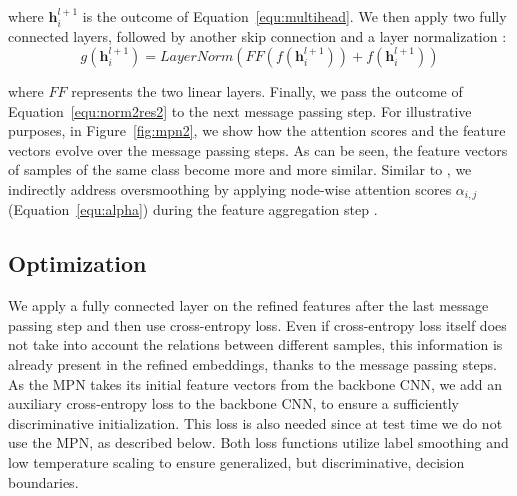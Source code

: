 \documentclass{article}
\begin{document}
where $\boldsymbol{h}_i^{l+1}$ is the outcome of Equation~\ref{equ:multihead}. We then apply two fully connected layers, followed by another skip connection \cite{7780459} and a layer normalization \cite{DBLP:journals/corr/BaKH16}: 
\begin{equation}
\label{equ:norm2res2}
    g(\boldsymbol{h}_i^{l+1}) = LayerNorm(FF(f(\boldsymbol{h}_i^{l+1})) + f(\boldsymbol{h}_i^{l+1}))
\end{equation}

where $FF$ represents the two linear layers. Finally, we pass the outcome of Equation~\ref{equ:norm2res2} to the next message passing step. 
For illustrative purposes, in Figure~\ref{fig:mpn2}, we show how the attention scores and the feature vectors evolve over the message passing steps. 
As can be seen, the feature vectors of samples of the same class become more and more similar. 
Similar to \cite{DBLP:conf/iclr/VelickovicCCRLB18}, we indirectly address oversmoothing by applying node-wise attention scores $\alpha_{i,j }$ (Equation~\ref{equ:alpha}) during the feature aggregation step \cite{DBLP:conf/nips/Min2020}. 

\iffalse
\begin{figure*}
\begin{center}
\texttt{[image: latex/tex\_files/figures/2iter.png]}
\end{center}
   \caption{An example of a two step message passing network and how the attention scores, as well as the feature vectors, change over the steps.}
\label{fig:2iter}
\end{figure*}
\fi
\vspace{-0.3cm}
\subsection{Optimization}

\iffalse
\begin{figure}[t]
\begin{center}
\texttt{[image: latex/tex\_files/figures/kreciprocal2.png]}
\end{center}
   \caption{Reciprocal k-nearest neighbor batch sampling for MPN during inference.}
\label{fig:kreciprocal}
\end{figure}
\fi

\label{subsec:optimization}
We apply a fully connected layer on the refined features after the last message passing step and then use cross-entropy loss.
Even if cross-entropy loss itself does not take into account the relations between different samples, this information is already present in the refined embeddings, thanks to the message passing steps. 
As the MPN takes its initial feature vectors from the backbone CNN, we add an auxiliary cross-entropy loss to the backbone CNN, to ensure a sufficiently discriminative initialization. This loss is also needed since at test time we do not use the MPN, as described below. 
Both loss functions utilize label smoothing and low temperature scaling \cite{DBLP:journals/corr/abs-2004-01113,DBLP:journals/corr/abs-1811-12649} to ensure generalized, but discriminative, decision boundaries.
\vspace{-0.3cm}
\end{document}
